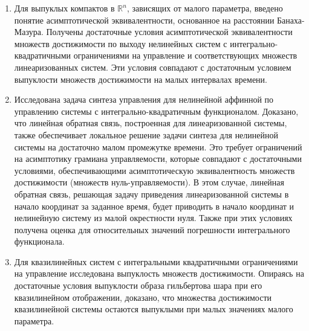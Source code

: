 \begin{enumerate}	
	\item Для выпуклых компактов в $\mathbb{R}^n$, зависящих от малого параметра, введено понятие асимптотической эквивалентности, основанное на расстоянии Банаха-Мазура.
	Получены достаточные условия асимптотической эквивалентности множеств достижимости по выходу нелинейных систем с интегрально-квадратичными ограничениями на управление и соответствующих множеств линеаризованных систем. 
	Эти условия совпадают с достаточным условием выпуклости множеств достижимости на малых интервалах времени.
	
	\item Исследована задача синтеза управления для нелинейной аффинной по управлению системы с интегрально-квадратичным функционалом. 
	Доказано, что линейная обратная связь, построенная для линеаризованной системы, также обеспечивает локальное решение задачи синтеза для нелинейной системы на достаточно малом промежутке времени. 
	Это требует ограничений на асимптотику грамиана управляемости, которые совпадают с достаточными условиями, обеспечивающими асимптотическую эквивалентность множеств достижимости (множеств нуль-управляемости). 
	В этом случае, линейная обратная связь, решающая задачу приведения линеаризованной системы в начало координат за заданное время, будет приводить в начало координат и нелинейную систему из малой окрестности нуля.
	Также при этих условиях получена оценка для относительных значений погрешности интегрального функционала. 
	
	\item Для квазилинейных систем с интегральными квадратичными ограничениями на управление исследована выпуклость множеств достижимости. 
	Опираясь на достаточные условия выпуклости образа гильбертова шара при его квазилинейном отображении, доказано, что множества достижимости квазилинейной системы остаются выпуклыми при малых значениях малого параметра. 
\end{enumerate}